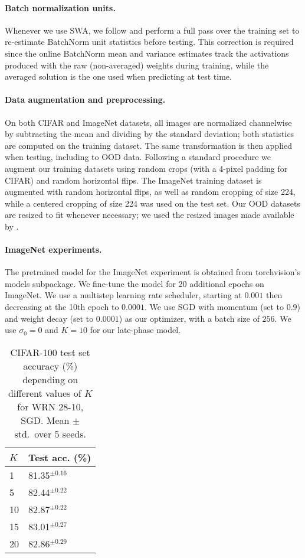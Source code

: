 \documentclass{article} \usepackage{iclr2021_conference,times}
\begin{document}
\paragraph{Batch normalization units.} Whenever we use SWA, we follow \citet{izmailov_averaging_2018} and perform a full pass over the training set to re-estimate BatchNorm unit statistics before testing. This correction is required since the online BatchNorm mean and variance estimates track the activations produced with the raw (non-averaged) weights during training, while the averaged solution is the one used when predicting at test time.

\paragraph{Data augmentation and preprocessing.} On both CIFAR and ImageNet datasets, all images are normalized channelwise by subtracting the mean and dividing by the standard deviation; both statistics are computed on the training dataset. The same transformation is then applied when testing, including to OOD data. Following a standard procedure \citep[e.g.,][]{zagoruyko_wide_2016,he_deep_2016} we augment our training datasets using random crops (with a 4-pixel padding for CIFAR) and random horizontal flips. The ImageNet training dataset is augmented with random horizontal flips, as well as random cropping of size 224, while a centered cropping of size 224 was used on the test set. Our OOD datasets are resized to fit whenever necessary; we used the resized images made available by \citet{lee_simple_2018}.

\paragraph{ImageNet experiments.} The pretrained model for the ImageNet experiment is obtained from torchvision's models subpackage. We fine-tune the model for 20 additional epochs on ImageNet. We use a multistep learning rate scheduler, starting at $0.001$ then decreasing at the 10th epoch to $0.0001$. We use SGD with momentum (set to $0.9$) and weight decay (set to $0.0001$) as our optimizer, with a batch size of $256$. We use $\sigma_0=0$ and $K=10$ for our late-phase model.

\begin{wraptable}[13]{R}{0.45\textwidth}
\centering
\caption{CIFAR-100 test set accuracy (\%) depending on different values of $K$ for WRN 28-10, SGD. Mean $\pm$ std.~over 5 seeds.\label{tab:k-sensitivity}}
\begin{tabular}{ll}
\toprule
 $K$   & Test acc. (\%) \\\midrule
1 &  81.35$^{\pm 0.16}$     \\
5 & 82.44$^{\pm 0.22}$  \\
10  & 82.87$^{\pm 0.22}$  \\
15  & 83.01$^{\pm 0.27}$  \\
20  & 82.86$^{\pm0.29}$  \\
\bottomrule  
\end{tabular}
\end{wraptable}
\end{document}
